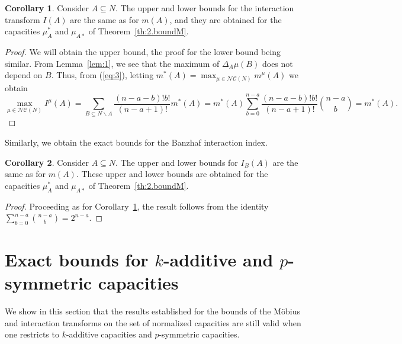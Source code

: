 \documentclass[12pt,a4paper]{article}
\theoremstyle{definition}
\newtheorem{corollary}{Corollary}
\theoremstyle{remark}
\def \NC {\mathscr{NC}}
\begin{document}
\begin{corollary}\label{cor:1}
Consider $A\subseteq N.$ The upper and lower bounds for the interaction
transform $I(A)$ are the same as
for $m(A)$, and they are obtained for the capacities $\mu^*_A$
and $\mu_{A*}$ of Theorem~\ref{th:2.boundM}.
\end{corollary}
\begin{proof}
We will obtain the upper bound, the proof for the lower bound being
similar. From Lemma~\ref{lem:1}, we see that the maximum of $\Delta_A\mu(B)$ does
not depend on $B$. Thus, from (\ref{eq:3}), letting
$m^*(A)=\max_{\mu\in\NC(N)}m^\mu(A)$ we obtain
\[
\max_{\mu\in\NC(N)}I^\mu(A) = \sum_{B\subseteq N\backslash A} \frac{(n-a-b)!b!}{(n-a+1)!} m^*(A) = m^*(A) \sum_{b=0}^{n-a} \frac{(n-a-b)!b!}{(n-a+1)!}
    \binom{n-a}{b} = m^*(A).
\]
\end{proof}

Similarly, we obtain the exact bounds for the Banzhaf interaction index.
\begin{corollary}
Consider $A\subseteq N.$ The upper and lower bounds for $I_B(A)$ are the same as
for $m(A).$ These upper and lower bounds are obtained for the capacities $\mu^*_A$
and $\mu_{A*}$ of Theorem~\ref{th:2.boundM}.
\end{corollary}
\begin{proof}
Proceeding as for Corollary~\ref{cor:1}, the result follows from the identity $\sum_{b=0}^{n-a}\binom{n-a}{b}=2^{n-a}$.
\end{proof}

\section{Exact bounds for $k$-additive and $p$-symmetric capacities}
We show in this section that the results established for the bounds of the
M\"obius and interaction transforms on the set of normalized capacities are
still valid when one restricts to $k$-additive capacities and $p$-symmetric capacities.
\end{document}
